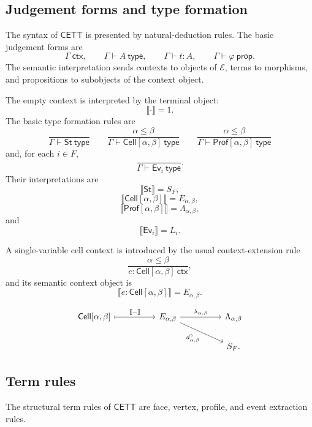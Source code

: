\subsection{Judgement forms and type formation}
\label{subsec:cmett-judgement-forms-type-formation}

The syntax of \(\mathsf{CETT}\) is presented by natural-deduction rules. The
basic judgement forms are
\[
    \Gamma\ \mathsf{ctx},
    \qquad
    \Gamma\vdash A\ \mathsf{type},
    \qquad
    \Gamma\vdash t:A,
    \qquad
    \Gamma\vdash \varphi\ \mathsf{prop}.
\]
The semantic interpretation sends contexts to objects of \(\mathcal E\), terms
to morphisms, and propositions to subobjects of the context object.

The empty context is interpreted by the terminal object:
\[
    \llbracket\cdot\rrbracket=1.
\]
The basic type formation rules are
\[
\frac{}{\Gamma\vdash \mathsf{St}\ \mathsf{type}}
\qquad
\frac{\alpha\leq\beta}{\Gamma\vdash \mathsf{Cell}[\alpha,\beta]\ \mathsf{type}}
\qquad
\frac{\alpha\leq\beta}{\Gamma\vdash \mathsf{Prof}[\alpha,\beta]\ \mathsf{type}}
\]
and, for each \(i\in F\),
\[
\frac{}{\Gamma\vdash \mathsf{Ev}_i\ \mathsf{type}}.
\]
Their interpretations are
\[
    \llbracket \mathsf{St}\rrbracket=S_F,
\]
\[
    \llbracket \mathsf{Cell}[\alpha,\beta]\rrbracket=E_{\alpha,\beta},
\]
\[
    \llbracket \mathsf{Prof}[\alpha,\beta]\rrbracket
    =
    \Lambda_{\alpha,\beta},
\]
and
\[
    \llbracket \mathsf{Ev}_i\rrbracket=L_i.
\]

A single-variable cell context is introduced by the usual context-extension
rule
\[
\frac{\alpha\leq\beta}
     {e:\mathsf{Cell}[\alpha,\beta]\ \mathsf{ctx}},
\]
and its semantic context object is
\[
    \llbracket e:\mathsf{Cell}[\alpha,\beta]\rrbracket
    =
    E_{\alpha,\beta}.
\]

\[
\begin{tikzcd}[column sep=huge]
\mathsf{Cell}[\alpha,\beta]
    \arrow[r, maps to, "\llbracket -\rrbracket"]
&
E_{\alpha,\beta}
    \arrow[r,"\lambda_{\alpha,\beta}"]
    \arrow[dr,"d_{\alpha,\beta}^{\gamma}"']
&
\Lambda_{\alpha,\beta}
\\
&&
S_F .
\end{tikzcd}
\]

\subsection{Term rules}
\label{subsec:cmett-term-rules}

The structural term rules of \(\mathsf{CETT}\) are face, vertex, profile, and
event extraction rules.

